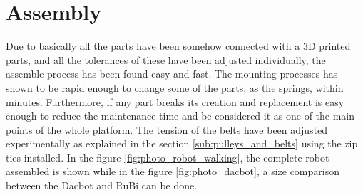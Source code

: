 \section{Assembly} %
\label{sec:assembly}
Due to basically all the parts have been somehow connected with a 3D printed parts, and all the tolerances of these have been adjusted individually, the assemble process has been found easy and fast.
The mounting processes has shown to be rapid enough to change some of the parts, as the springs, within minutes.
Furthermore, if any part breaks its creation and replacement is easy enough to reduce the maintenance time and be considered it as one of the main points of the whole platform.
The tension of the belts have been adjusted experimentally as explained in the section \ref{sub:pulleys_and_belts} using the zip ties installed.
In the figure \ref{fig:photo_robot_walking}, the complete robot assembled is shown while in the figure \ref{fig:photo_dacbot}, a size comparison between the Dacbot \cite{dacbot1} and RuBi can be done.

